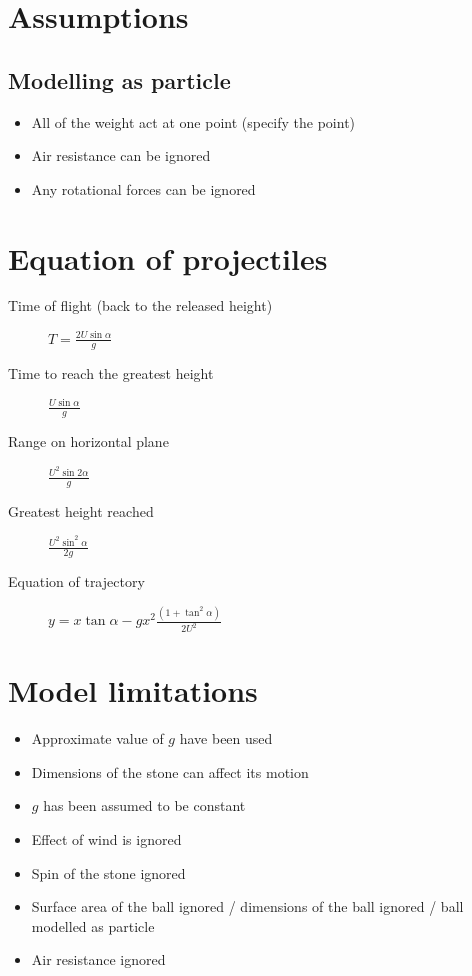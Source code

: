 \section{Assumptions}
\subsection{Modelling as particle}
\begin{itemize}
    \item All of the weight act at one point (specify the point)
    \item Air resistance can be ignored
    \item Any rotational forces can be ignored
\end{itemize}

\section{Equation of projectiles}
\begin{description}
    \item[Time of flight (back to the released height)] $T=\frac{2U\sin\alpha}{g}$
    \item[Time to reach the greatest height] $\frac{U\sin\alpha}{g}$
    \item[Range on horizontal plane] $\frac{U^2\sin 2\alpha}{g}$
    \item[Greatest height reached] $\frac{U^2\sin^2\alpha}{2g}$
    \item[Equation of trajectory] $y=x\tan\alpha - gx^{2}\frac{\left(1+\tan^2\alpha\right)}{2U^2}$ 
\end{description}

\section{Model limitations}
\begin{itemize}
    \item Approximate value of $g$ have been used
    \item Dimensions of the stone can affect its motion
    \item $g$ has been assumed to be constant
    \item Effect of wind is ignored
    \item Spin of the stone ignored
    \item Surface area of the ball ignored / dimensions of the ball ignored / ball modelled as particle
    \item Air resistance ignored
\end{itemize}